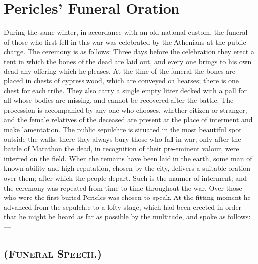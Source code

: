 
\author{Thucydides}
\chapter{Pericles' Funeral Oration}

During the same winter, in accordance with an old national
custom, the funeral of those who first fell in this war was celebrated
by the Athenians at the public charge. The ceremony is as follows:
Three days before the celebration they erect a tent in which the bones
of the dead are laid out, and every one brings to his own dead any
offering which he pleases. At the time of the funeral the bones are
placed in chests of cypress wood, which are conveyed on hearses; there
is one chest for each tribe. They also carry a single empty litter
decked with a pall for all whose bodies are missing, and cannot be
recovered after the battle. The procession is accompanied by any one
who chooses, whether citizen or stranger, and the female relatives of
the deceased are present at the place of interment and make
lamentation. The public sepulchre is situated in the most beautiful
spot outside the walls; there they always bury those who fall in war;
only after the battle of Marathon the dead, in recognition of their
pre-eminent valour, were interred on the field. When the remains have
been laid in the earth, some man of known ability and high reputation,
chosen by the city, delivers a suitable oration over them; after which
the people depart. Such is the manner of interment; and  the
ceremony was repeated from time to time throughout the war. Over those
who were the first buried Pericles was chosen to speak. At the fitting
moment he advanced from the sepulchre to a lofty stage, which had been
erected in order that he might be heard as far as possible by the
multitude, and spoke as follows:---

\section{(\textsc{Funeral Speech}.)}

